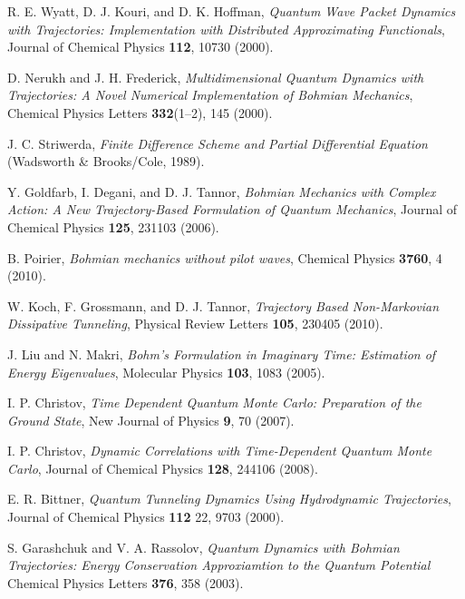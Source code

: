 \documentclass[nofootinbib, secnumarabic, amsmath, nobibnotes,10pt,aps,pra]{revtex4-1}
\begin{document}
\begin{thebibliography}{999}
R. E. Wyatt, D. J. Kouri, and D. K. Hoffman, \emph{Quantum Wave Packet Dynamics with Trajectories: Implementation with Distributed Approximating Functionals}, Journal of Chemical Physics \textbf{112},  10730 (2000).

D. Nerukh and J. H. Frederick, \emph{Multidimensional Quantum Dynamics with Trajectories: A Novel Numerical Implementation of
Bohmian Mechanics}, Chemical Physics Letters \textbf{332}(1--2),  145 (2000).

J. C. Striwerda, \emph{Finite Difference Scheme and Partial Differential Equation} (Wadsworth \& Brooks/Cole, 1989).

Y. Goldfarb, I. Degani, and D. J. Tannor, \emph{Bohmian Mechanics with Complex Action: A New Trajectory-Based Formulation of Quantum Mechanics}, Journal of Chemical Physics \textbf{125},  231103 (2006).

B. Poirier, \emph{Bohmian mechanics without pilot waves}, Chemical Physics \textbf{3760}, 4 (2010).

W. Koch, F. Grossmann, and D. J. Tannor, \emph{Trajectory Based Non-Markovian Dissipative Tunneling}, Physical Review Letters \textbf{105},  230405 (2010).

J. Liu and N. Makri, \emph{Bohm's Formulation in Imaginary Time: Estimation of Energy Eigenvalues}, Molecular Physics \textbf{103},  1083 (2005).

I. P. Christov, \emph{Time Dependent Quantum Monte Carlo: Preparation of the Ground State}, New Journal of Physics \textbf{9},  70 (2007).

I. P. Christov, \emph{Dynamic Correlations with Time-Dependent Quantum Monte Carlo}, Journal of Chemical Physics \textbf{128},  244106 (2008).

E. R. Bittner, \emph{Quantum Tunneling Dynamics Using Hydrodynamic Trajectories}, Journal of Chemical Physics \textbf{112} 22,  9703 (2000).

S. Garashchuk and V. A. Rassolov, \emph{Quantum Dynamics with Bohmian Trajectories: Energy Conservation Approxiamtion to the Quantum Potential} Chemical Physics Letters \textbf{376},  358 (2003).


\end{thebibliography}
\end{document}
